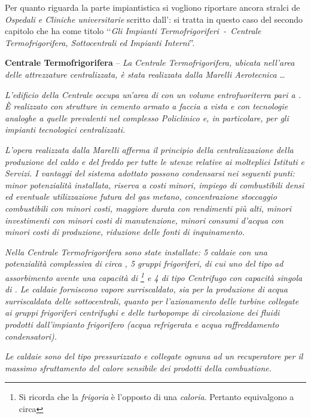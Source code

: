 \noindent Per quanto riguarda la parte impiantistica si vogliono riportare ancora stralci de \emph{Ospedali e Cliniche universitarie} scritto dall': si tratta in questo caso del secondo capitolo che ha come titolo ‘‘\emph{Gli Impianti Termofrigoriferi~-~\emph{Centrale Termofrigorifera, Sottocentrali ed Impianti Interni}}''.
\begin{quoting}
	\textbf{Centrale Termofrigorifera} -- \emph{La Centrale Termofrigorifera, ubicata nell'area delle attrezzature centralizzata, è stata realizzata dalla Marelli Aerotecnica} \dots
		
\sdots 
	
	\emph{L'edificio della Centrale occupa un'area di  con un volume entrofuoriterra pari a . È realizzato con strutture in cemento armato a faccia a vista e con tecnologie analoghe a quelle prevalenti nel complesso Policlinico e, in particolare, per gli impianti tecnologici centralizzati.}
	
	\emph{L'opera realizzata dalla Marelli afferma il principio della centralizzazione della produzione del caldo e del freddo per tutte le utenze relative ai molteplici Istituti e Servizi. I vantaggi del sistema adottato possono condensarsi nei seguenti punti: minor potenzialità installata, riserva a costi minori, impiego di combustibili densi ed eventuale utilizzazione futura del gas metano, concentrazione stoccaggio combustibili con minori costi, maggiore durata con rendimenti più alti, minori investimenti con minori costi di manutenzione, minori consumi d'acqua con minori costi di produzione, riduzione delle fonti di inquinamento.}
	
	\emph{Nella Centrale Termofrigorifera sono state installate: 5 caldaie con una potenzialità complessiva di circa , 5 gruppi frigoriferi, di cui uno del tipo ad assorbimento avente una capacità di \footnote{Si ricorda che la \emph{frigoria} è l'opposto di una \emph{caloria}. Pertanto  equivalgono a circa } e 4 di tipo Centrifugo con capacità singola di . Le caldaie forniscono vapore surriscaldato, sia per la produzione di acqua surriscaldata delle sottocentrali, quanto per l'azionamento delle turbine collegate ai gruppi frigoriferi centrifughi e delle turbopompe di circolazione dei fluidi prodotti dall'impianto frigorifero (acqua refrigerata e acqua raffreddamento condensatori).}
	
	\emph{Le caldaie sono del tipo pressurizzato e collegate ognuna ad un recuperatore per il massimo sfruttamento del calore sensibile dei prodotti della combustione.}
	

\end{quoting}
